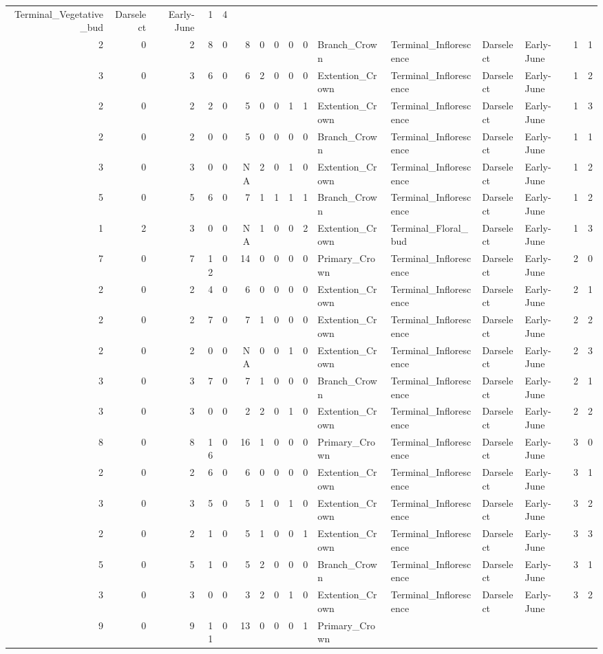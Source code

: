 \documentclass[]{article}
\begin{document}
\begin{longtable}[]{@{}rrrrrrrrrrllllrl@{}}
Terminal\_Vegetative\_bud & Darselect & Early-June & 1 &
4\tabularnewline
2 & 0 & 2 & 8 & 0 & 8 & 0 & 0 & 0 & 0 & Branch\_Crown &
Terminal\_Inflorescence & Darselect & Early-June & 1 & 1\tabularnewline
3 & 0 & 3 & 6 & 0 & 6 & 2 & 0 & 0 & 0 & Extention\_Crown &
Terminal\_Inflorescence & Darselect & Early-June & 1 & 2\tabularnewline
2 & 0 & 2 & 2 & 0 & 5 & 0 & 0 & 1 & 1 & Extention\_Crown &
Terminal\_Inflorescence & Darselect & Early-June & 1 & 3\tabularnewline
2 & 0 & 2 & 0 & 0 & 5 & 0 & 0 & 0 & 0 & Branch\_Crown &
Terminal\_Inflorescence & Darselect & Early-June & 1 & 1\tabularnewline
3 & 0 & 3 & 0 & 0 & NA & 2 & 0 & 1 & 0 & Extention\_Crown &
Terminal\_Inflorescence & Darselect & Early-June & 1 & 2\tabularnewline
5 & 0 & 5 & 6 & 0 & 7 & 1 & 1 & 1 & 1 & Branch\_Crown &
Terminal\_Inflorescence & Darselect & Early-June & 1 & 2\tabularnewline
1 & 2 & 3 & 0 & 0 & NA & 1 & 0 & 0 & 2 & Extention\_Crown &
Terminal\_Floral\_bud & Darselect & Early-June & 1 & 3\tabularnewline
7 & 0 & 7 & 12 & 0 & 14 & 0 & 0 & 0 & 0 & Primary\_Crown &
Terminal\_Inflorescence & Darselect & Early-June & 2 & 0\tabularnewline
2 & 0 & 2 & 4 & 0 & 6 & 0 & 0 & 0 & 0 & Extention\_Crown &
Terminal\_Inflorescence & Darselect & Early-June & 2 & 1\tabularnewline
2 & 0 & 2 & 7 & 0 & 7 & 1 & 0 & 0 & 0 & Extention\_Crown &
Terminal\_Inflorescence & Darselect & Early-June & 2 & 2\tabularnewline
2 & 0 & 2 & 0 & 0 & NA & 0 & 0 & 1 & 0 & Extention\_Crown &
Terminal\_Inflorescence & Darselect & Early-June & 2 & 3\tabularnewline
3 & 0 & 3 & 7 & 0 & 7 & 1 & 0 & 0 & 0 & Branch\_Crown &
Terminal\_Inflorescence & Darselect & Early-June & 2 & 1\tabularnewline
3 & 0 & 3 & 0 & 0 & 2 & 2 & 0 & 1 & 0 & Extention\_Crown &
Terminal\_Inflorescence & Darselect & Early-June & 2 & 2\tabularnewline
8 & 0 & 8 & 16 & 0 & 16 & 1 & 0 & 0 & 0 & Primary\_Crown &
Terminal\_Inflorescence & Darselect & Early-June & 3 & 0\tabularnewline
2 & 0 & 2 & 6 & 0 & 6 & 0 & 0 & 0 & 0 & Extention\_Crown &
Terminal\_Inflorescence & Darselect & Early-June & 3 & 1\tabularnewline
3 & 0 & 3 & 5 & 0 & 5 & 1 & 0 & 1 & 0 & Extention\_Crown &
Terminal\_Inflorescence & Darselect & Early-June & 3 & 2\tabularnewline
2 & 0 & 2 & 1 & 0 & 5 & 1 & 0 & 0 & 1 & Extention\_Crown &
Terminal\_Inflorescence & Darselect & Early-June & 3 & 3\tabularnewline
5 & 0 & 5 & 1 & 0 & 5 & 2 & 0 & 0 & 0 & Branch\_Crown &
Terminal\_Inflorescence & Darselect & Early-June & 3 & 1\tabularnewline
3 & 0 & 3 & 0 & 0 & 3 & 2 & 0 & 1 & 0 & Extention\_Crown &
Terminal\_Inflorescence & Darselect & Early-June & 3 & 2\tabularnewline
9 & 0 & 9 & 11 & 0 & 13 & 0 & 0 & 0 & 1 & Primary\_Crown &

\end{longtable}
\end{document}
